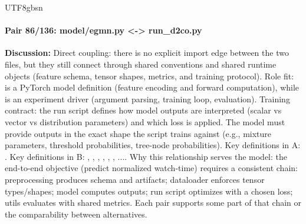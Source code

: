 \documentclass[11pt]{article}
\begin{document}
\begin{CJK*}{UTF8}{gbsn}
\paragraph{Pair 86/136: model/egmn.py <-> run\_d2co.py}
\textbf{Discussion:} Direct coupling: there is no explicit import edge between the two files, but they still connect through shared conventions and shared runtime objects (feature schema, tensor shapes, metrics, and training protocol). Role fit: \texttt{} is a PyTorch model definition (feature encoding and forward computation), while \texttt{} is an experiment driver (argument parsing, training loop, evaluation). Training contract: the run script defines how model outputs are interpreted (scalar vs vector vs distribution parameters) and which loss is applied. The model must provide outputs in the exact shape the script trains against (e.g., mixture parameters, threshold probabilities, tree-node probabilities). Key definitions in A: \texttt{}. Key definitions in B: \texttt{}, \texttt{}, \texttt{}, \texttt{}, \texttt{}, \texttt{}, .... Why this relationship serves the model: the end-to-end objective (predict normalized watch-time) requires a consistent chain: preprocessing produces schema and artifacts; dataloader enforces tensor types/shapes; model computes outputs; run script optimizes with a chosen loss; utils evaluates with shared metrics. Each pair supports some part of that chain or the comparability between alternatives.


\end{CJK*}
\end{document}
